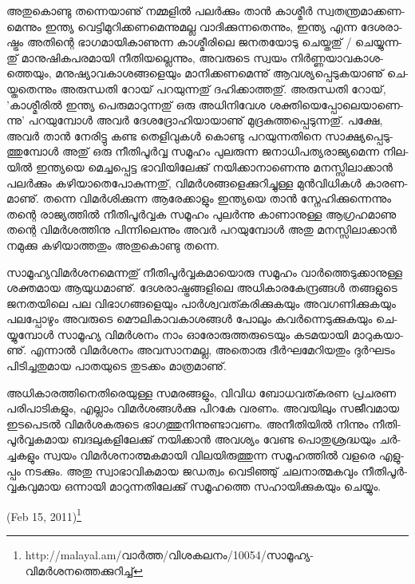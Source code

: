 അ­തു­കൊ­ണ്ടു തന്നെ­യാ­ണു് നമ്മ­ളില്‍ പലര്‍­ക്കും താന്‍ ­കാ­ശ്മീര്‍ സ്വ­ത­ന്ത്ര­മാ­ക്ക­ണ­മെ­ന്നും ഇന്ത്യ വെ­ട്ടി­മു­റി­ക്ക­ണ­മെ­ന്നു­മ­ല്ല 
വാ­ദി­ക്കു­ന്ന­തെ­ന്നും, ഇന്ത്യ എന്ന ദേ­ശ­രാ­ഷ്ട്രം അതി­ന്റെ ഭാ­ഗ­മാ­യി­കാ­ണു­ന്ന കാ­ശ്മീ­രി­ലെ ജന­ത­യോ­ടു ചെ­യ്ത­തു് / ചെ­യ്യു­ന്ന­തു് മാ­നു­ഷി­ക­പ­ര­മാ­യി 
നീ­തി­യ­ല്ലെ­ന്നും, അവ­രു­ടെ സ്വ­യം നിര്‍­ണ്ണ­യാ­വ­കാ­ശ­ത്തെ­യും, മനു­ഷ്യാ­വ­കാ­ശ­ങ്ങ­ളെ­യും മാ­നി­ക്ക­ണ­മെ­ന്നു് ആവ­ശ്യ­പ്പെ­ടു­ക­യാ­ണു് ചെ­യ്ത­തെ­ന്നും
 അരു­ന്ധ­തി റോ­യ് പറ­യു­ന്ന­തു് ദഹി­ക്കാ­ത്ത­തു്. അരു­ന്ധ­തി റോ­യ്, 'കാ­ശ്മീ­രില്‍ ഇന്ത്യ പെ­രു­മാ­റു­ന്ന­തു് ഒരു അധി­നി­വേശ ശക്തി­യെ­പ്പോ­ലെ­യാ­ണെ­ന്നു' 
 പറ­യു­മ്പോള്‍ അവര്‍ ദേ­ശ­ദ്രോ­ഹി­യാ­യാ­ണു് മു­ദ്ര­കു­ത്ത­പ്പെ­ടു­ന്ന­തു്. പക്ഷേ, അവര്‍ താന്‍ നേ­രി­ട്ടു കണ്ട തെ­ളി­വു­കള്‍ കൊ­ണ്ടു പറ­യു­ന്ന­തി­നെ
  സാ­ക്ഷ്യ­പ്പെ­ടു­ത്തു­മ്പോള്‍ അതു് ഒരു നീ­തി­പൂര്‍­വ്വ സമൂ­ഹം പു­ല­രു­ന്ന ജനാ­ധി­പ­ത്യ­രാ­ജ്യ­മെ­ന്ന നി­ല­യില്‍ ഇന്ത്യ­യെ മെ­ച്ച­പ്പെ­ട്ട ഭാ­വി­യി­ലേ­ക്കു് 
  നയി­ക്കാ­നാ­ണെ­ന്നു മന­സ്സി­ലാ­ക്കാന്‍ പലര്‍­ക്കും കഴി­യാ­തെ­പോ­കു­ന്ന­തു്, വി­മര്‍­ശ­ങ്ങ­ളെ­ക്കു­റി­ച്ചു­ള്ള മുന്‍­വി­ധി­കള്‍ കാ­ര­ണ­മാ­ണു്.  
  തന്നെ വി­മര്‍­ശി­ക്കു­ന്ന ആരേ­ക്കാ­ളും ഇന്ത്യ­യെ താന്‍ സ്നേ­ഹി­ക്കു­ന്നെ­ന്നും തന്റെ രാ­ജ്യ­ത്തില്‍ നീ­തി­പൂര്‍­വ്വക സമൂ­ഹം പു­ലര്‍­ന്നു കാ­ണാ­നു­ള്ള 
  ആഗ്ര­ഹ­മാ­ണു തന്റെ വി­മര്‍­ശ­ത്തി­നു പി­ന്നി­ലെ­ന്നും അവര്‍ പറ­യു­മ്പോള്‍ അതു മന­സ്സി­ലാ­ക്കാന്‍ നമു­ക്കു കഴി­യാ­ത്ത­തും അതു­കൊ­ണ്ടു തന്നെ­.

­സാ­മൂ­ഹ്യ­വി­മര്‍­ശ­ന­മെ­ന്ന­തു് നീ­തി­പൂര്‍­വ്വ­ക­മാ­യൊ­രു സമൂ­ഹം വാര്‍­ത്തെ­ടു­ക്കാ­നു­ള്ള ശക്ത­മായ ആയു­ധ­മാ­ണു്. ദേ­ശ­രാ­ഷ്ട്ര­ങ്ങ­ളി­ലെ 
അധി­കാ­ര­കേ­ന്ദ്ര­ങ്ങള്‍ തങ്ങ­ളു­ടെ ജന­ത­യി­ലെ പല വി­ഭാ­ഗ­ങ്ങ­ളെ­യും പാര്‍­ശ്വ­വ­ത്ക­രി­ക്കു­ക­യും അവ­ഗ­ണി­ക്കു­ക­യും പല­പ്പോ­ഴും അവ­രു­ടെ 
മൌ­ലി­കാ­വ­കാ­ശ­ങ്ങള്‍ പോ­ലും കവര്‍­ന്നെ­ടു­ക്കു­ക­യും ചെ­യ്യു­മ്പോള്‍ സാ­മൂ­ഹ്യ വി­മര്‍­ശ­നം നാം ഓരോ­രു­ത്ത­രു­ടെ­യും കട­മ­യാ­യി മാ­റു­ക­യാ­ണു്. 
എന്നാല്‍ വി­മര്‍­ശ­നം അവ­സാ­ന­മ­ല്ല, അതൊ­രു ദീര്‍­ഘ­മേ­റി­യ­തും ദുര്‍­ഘ­ടം പി­ടി­ച്ച­തു­മായ പാ­ത­യു­ടെ തു­ട­ക്കം മാ­ത്ര­മാ­ണു്.

അ­ധി­കാ­ര­ത്തി­നെ­തി­രെ­യു­ള്ള സമ­ര­ങ്ങ­ളും, വി­വിധ ബോ­ധ­വ­ത്ക­രണ പ്ര­ച­രണ പരി­പാ­ടി­ക­ളും, എല്ലാം വി­മര്‍­ശ­ങ്ങള്‍­ക്കു പി­റ­കേ വര­ണം.
 അവ­യി­ലും സജീ­വ­മായ ഇട­പെ­ടല്‍ വി­മര്‍­ശ­ക­രു­ടെ ഭാ­ഗ­ത്തു­നി­ന്നു­ണ്ടാ­വ­ണം. അനീ­തി­യില്‍ നി­ന്നും നീ­തി­പൂര്‍­വ്വ­ക­മായ ബദ­ലു­ക­ളി­ലേ­ക്കു് 
 നയി­ക്കാന്‍ അവ­ശ്യം വേ­ണ്ട പൊ­തു­ശ്ര­ദ്ധ­യും ചര്‍­ച്ച­ക­ളും സ്വ­യം വി­മര്‍­ശ­നാ­ത്മ­ക­മാ­യി വി­ല­യി­രു­ത്തു­ന്ന സമൂ­ഹ­ത്തില്‍ വള­രെ എളു­പ്പം നട­ക്കും. 
 അതു സ്വാ­ഭാ­വി­ക­മായ ജഡ­ത്വം വെ­ടി­ഞ്ഞു് ചല­നാ­ത്മ­ക­വും നീ­തി­പൂര്‍­വ്വ­ക­വു­മായ ഒന്നാ­യി മാ­റു­ന്ന­തി­ലേ­ക്കു് സമൂ­ഹ­ത്തെ സഹാ­യി­ക്കു­ക­യും ചെ­യ്യും­.

(Feb 15, 2011)\footnote{http://malayal.am/വാര്‍ത്ത/വിശകലനം/10054/സാമൂഹ്യ-വിമര്‍ശനത്തെക്കുറിച്ച്}
\newpage
